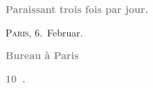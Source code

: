 \pstart
           \begin{otherlanguage}{french}\textcolor{gray}{\textbf{\textbf{Paraissant trois fois par jour.}}}\end{otherlanguage}\hfill \textsc{Paris}, 6. Februar.\pend
           
\pstart
           \begin{otherlanguage}{french}\textcolor{gray}{\textbf{\textbf{Bureau à Paris}}}\end{otherlanguage}\pend
           
\pstart
           \begin{otherlanguage}{french}\textcolor{gray}{\textbf{\textbf{10 .}}}\end{otherlanguage}\pend
           
